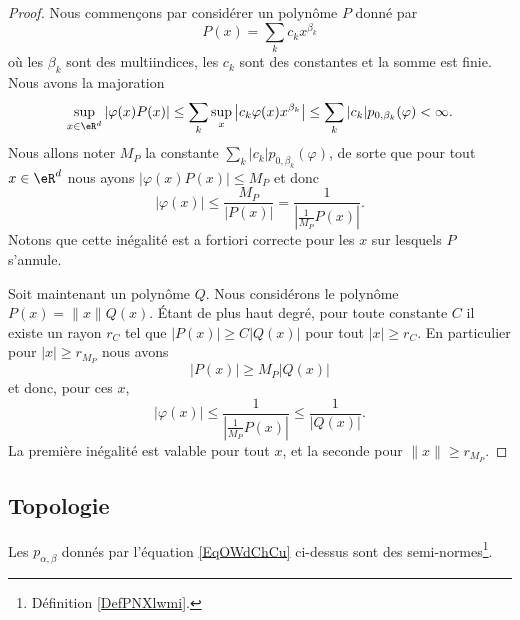 \begin{proof}
    Nous commençons par considérer un polynôme \( P\) donné par
    \begin{equation}
        P(x)=\sum_kc_kx^{\beta_k}
    \end{equation}
    où les \( \beta_k\) sont des multiindices, les \( c_k\) sont des constantes et la somme est finie. Nous avons la majoration
    \begin{equation}
        \sup_{x\in \eR^d}| \varphi(x)P(x) |\leq\sum_k\sup_x\big| c_k\varphi(x) x^{\beta_k} \big|\leq\sum_k| c_k |p_{0,\beta_k}(\varphi)<\infty.
    \end{equation}
    Nous allons noter \( M_P\) la constante \( \sum_k| c_k |p_{0,\beta_k}(\varphi)\), de sorte que pour tout \( x\in \eR^d\) nous ayons \( | \varphi(x)P(x) |\leq M_P\) et donc
    \begin{equation}
        | \varphi(x) |\leq \frac{ M_P }{ | P(x) | }=\frac{1}{ | \frac{1}{ M_P }P(x) | }.
    \end{equation}
    Notons que cette inégalité est a fortiori correcte pour les \( x\) sur lesquels \( P\) s'annule.

    Soit maintenant un polynôme \( Q\). Nous considérons le polynôme \( P(x)=\| x \|Q(x)\). Étant de plus haut degré, pour toute constante \( C\) il existe un rayon \( r_C\) tel que \( | P(x) |\geq C| Q(x) |\) pour tout \( | x |\geq r_C\). En particulier pour \( | x |\geq r_{M_P}\) nous avons
    \begin{equation}
        | P(x) |\geq M_P| Q(x) |
    \end{equation}
    et donc, pour ces \( x\), 
    \begin{equation}
        | \varphi(x) |\leq \frac{1}{ | \frac{1}{ M_P }P(x) | }\leq \frac{1}{ | Q(x) | }.
    \end{equation}
    La première inégalité est valable pour tout \( x\), et la seconde pour \( \| x \|\geq r_{M_P}\).
\end{proof}

\subsection{Topologie}

\begin{lemma}
    Les \( p_{\alpha,\beta}\) donnés par l'équation \eqref{EqOWdChCu} ci-dessus sont des semi-normes\footnote{Définition \ref{DefPNXlwmi}.}.
\end{lemma}


